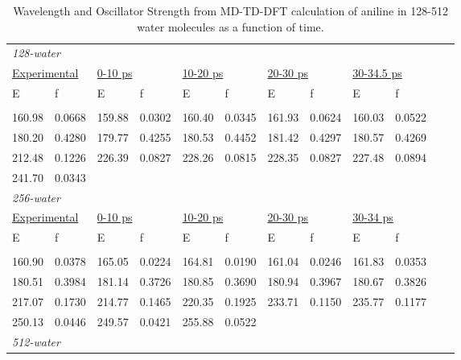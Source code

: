 \documentclass[
journal=jpcbfk, %
manuscript=article]{achemso}
\begin{document}
		\begin{table}[ht]
			\small
			\scriptsize
			\caption{Wavelength and Oscillator Strength from MD-TD-DFT calculation of aniline in 128-512 water molecules as a function of time.}
			\hfill
			\label{Table:dataByTime}
			\begin{tabular}[l]{llllllllllll}
				\multicolumn{10}{l}{\textit{128-water}} \\
				\multicolumn{2}{l}{\underline{Experimental}} &
				\multicolumn{2}{l}{\underline{0-10 ps}} &
				\multicolumn{2}{l}{\underline{10-20 ps}} &
				\multicolumn{2}{l}{\underline{20-30 ps}} &
				\multicolumn{2}{l}{\underline{30-34.5 ps}} & 
				\hphantom{\underline{30-34.5 ps}} & 
				\hphantom{\underline{30-34.5 ps}} \\ [1ex]
				E    & f    & E    & f    & E    & f    & E    & f    & E    & f \\ [0.5ex]
				\hline\hline
				\\[-0.5ex]
				160.98	&	0.0668	&	159.88	&	0.0302	&	160.40	&	0.0345	&	161.93	&	0.0624	&	160.03	&	0.0522 \\
				180.20	&	0.4280	&	179.77	&	0.4255	&	180.53	&	0.4452	&	181.42	&	0.4297	&	180.57	&	0.4269 \\
				212.48	&	0.1226	&	226.39	&	0.0827	&	228.26	&	0.0815	&	228.35	&	0.0827	&	227.48	&	0.0894 \\
				241.70	&	0.0343	&	~	&	~	&	~	&	~	&	~	&	~	&	~	&	~ \\ [1ex]
				\multicolumn{10}{l}{\textit{256-water}} \\
				\multicolumn{2}{l}{\underline{Experimental}} &
				\multicolumn{2}{l}{\underline{0-10 ps}} &
				\multicolumn{2}{l}{\underline{10-20 ps}} &
				\multicolumn{2}{l}{\underline{20-30 ps}} &
				\multicolumn{2}{l}{\underline{30-34 ps}} \\ [1ex]
				E    & f    & E    & f    & E    & f    & E    & f    & E    & f \\ [0.5ex]
				\hline\hline
				\\[-0.5ex]
				160.90	&	0.0378	&	165.05	&	0.0224	&	164.81	&	0.0190	&	161.04	&	0.0246	&	161.83	&	0.0353 \\
				180.51	&	0.3984	&	181.14	&	0.3726	&	180.85	&	0.3690	&	180.94	&	0.3967	&	180.67	&	0.3826 \\
				217.07	&	0.1730	&	214.77	&	0.1465	&	220.35	&	0.1925	&	233.71	&	0.1150	&	235.77	&	0.1177 \\
				250.13	&	0.0446	&	249.57	&	0.0421	&	255.88	&	0.0522	&	~	&	~	&	~	&	~ \\ [1ex]
				\multicolumn{10}{l}{\textit{512-water}} \\

\end{tabular}
\end{table}
\end{document}
